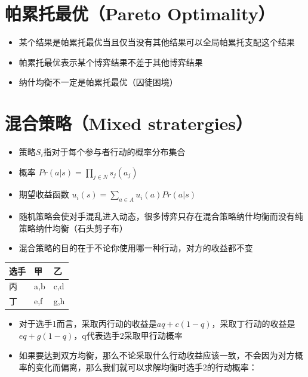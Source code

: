 \documentclass[
]{book}
\providecommand{\tightlist}{%
  \setlength{\itemsep}{0pt}\setlength{\parskip}{0pt}}
\begin{document}
\hypertarget{ux5e15ux7d2fux6258ux6700ux4f18pareto-optimality}{%
\section{帕累托最优（Pareto Optimality）}\label{ux5e15ux7d2fux6258ux6700ux4f18pareto-optimality}}

\begin{itemize}
\tightlist
\item
  某个结果是帕累托最优当且仅当没有其他结果可以全局帕累托支配这个结果
\item
  帕累托最优表示某个博弈结果不差于其他博弈结果
\item
  纳什均衡不一定是帕累托最优（囚徒困境）
\end{itemize}

\hypertarget{ux6df7ux5408ux7b56ux7565mixed-stratergies}{%
\section{混合策略（Mixed stratergies）}\label{ux6df7ux5408ux7b56ux7565mixed-stratergies}}

\begin{itemize}
\tightlist
\item
  策略\(S_i\)指对于每个参与者行动的概率分布集合
\item
  概率 \(Pr(a|s) = \prod_{j \in N}s_j(a_j)\)
\item
  期望收益函数 \(u_i(s) = \sum_{a \in A} u_i(a)Pr(a|s)\)
\item
  随机策略会使对手混乱进入动态，很多博弈只存在混合策略纳什均衡而没有纯策略纳什均衡（石头剪子布）
\item
  混合策略的目的在于不论你使用哪一种行动，对方的收益都不变
\end{itemize}

\begin{longtable}[]{@{}lll@{}}
\toprule
选手 & 甲 & 乙\tabularnewline
\midrule
\endhead
丙 & a,b & c,d\tabularnewline
丁 & e,f & g,h\tabularnewline
\bottomrule
\end{longtable}

\begin{itemize}
\tightlist
\item
  对于选手1而言，采取丙行动的收益是\(aq+c(1-q)\)，采取丁行动的收益是\(eq+g(1-q)\)，q代表选手2采取甲行动概率
\item
  如果要达到双方均衡，那么不论采取什么行动收益应该一致，不会因为对方概率的变化而偏离，那么我们就可以求解均衡时选手2的行动概率：
\end{itemize}
\end{document}
